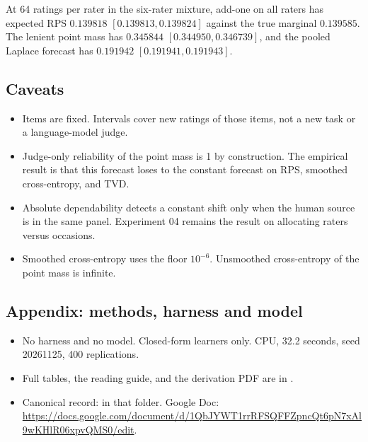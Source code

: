 At 64 ratings per rater in the six-rater mixture, add-one on all raters has expected RPS $0.139818$ $[0.139813,0.139824]$ against the true marginal $0.139585$. The lenient point mass has $0.345844$ $[0.344950,0.346739]$, and the pooled Laplace forecast has $0.191942$ $[0.191941,0.191943]$.

\subsection*{Caveats}
\begin{itemize}
\item Items are fixed. Intervals cover new ratings of those items, not a new task or a language-model judge.
\item Judge-only reliability of the point mass is 1 by construction. The empirical result is that this forecast loses to the constant forecast on RPS, smoothed cross-entropy, and TVD.
\item Absolute dependability detects a constant shift only when the human source is in the same panel. Experiment 04 remains the result on allocating raters versus occasions.
\item Smoothed cross-entropy uses the floor $10^{-6}$. Unsmoothed cross-entropy of the point mass is infinite.
\end{itemize}

\subsection*{Appendix: methods, harness and model}
\begin{itemize}
\item No harness and no model. Closed-form learners only. CPU, 32.2 seconds, seed 20261125, 400 replications.
\item Full tables, the reading guide, and the derivation PDF are in .
\item Canonical record:  in that folder. Google Doc: \url{https://docs.google.com/document/d/1QbJYWT1rrRFSQFFZpncQt6pN7xAl9wKHlR06xpvQMS0/edit}.
\end{itemize}
